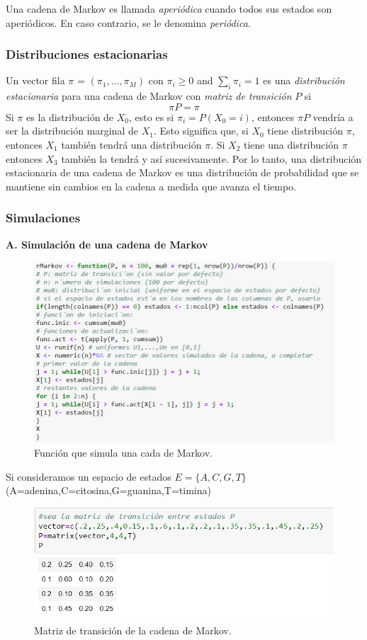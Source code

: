 \documentclass{article}
\theoremstyle{definition}
\theoremstyle{remark}
\begin{document}
Una cadena de Markov es llamada \textit{aperiódica} cuando todos sus estados son aperiódicos. En caso contrario, se le denomina \textit{periódica}.

\subsubsection{Distribuciones estacionarias}
Un vector fila $\pi$ = $(\pi_{1},\dots,\pi_{M})$ con $\pi_{i}\geq0$ and $\sum_{i}\pi_{i} = 1$ es una \textit{distribución estacionaria} para una cadena de Markov con \textit{matriz de transición} $P$ si
\[
\pi P = \pi
\]
Si $\pi$ es la distribución de $X_{0}$, esto es si $\pi_{i} = P(X_{0} = i)$, entonces $\pi P$ vendría a ser la distribución marginal de $X_{1}$. Esto significa que, si $X_{0}$ tiene distribución $\pi$, entonces $X_{1}$ también tendrá una distribución $\pi$. Si $X_{2}$ tiene una distribución $\pi$ entonces $X_{3}$ también la tendrá y así sucesivamente.
Por lo tanto, una distribución estacionaria de una cadena de Markov es una distribución de probabilidad que se mantiene sin cambios en la cadena a medida que avanza el tiempo.
\subsubsection{Simulaciones}
\textbf{A. Simulación de una cadena de Markov}

\begin{figure}[!h]
	\centering
	\includegraphics[scale=0.8]{fun1}
	\caption{Función que simula una cada de Markov.}
	\label{figura1}
\end{figure}

Si consideramos un espacio de estados $E=\{A,C,G,T\}$ (A=adenina,C=citosina,G=guanina,T=timina)

\begin{figure}[!h]
	\centering
	\includegraphics[scale=0.8]{fun2}
	\caption{Matriz de transición de la cadena de Markov.}
	\label{figura2}
\end{figure}
\end{document}
